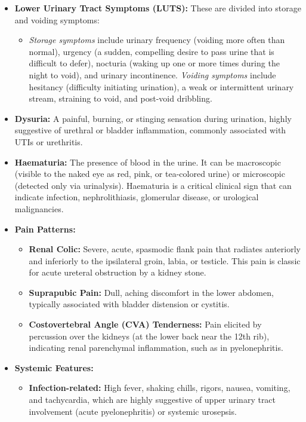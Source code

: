 \begin{itemize}
    \item \textbf{Lower Urinary Tract Symptoms (LUTS):} These are divided into storage and voiding symptoms:
    \begin{itemize}
        \item \textit{Storage symptoms} include urinary frequency (voiding more often than normal), urgency (a sudden, compelling desire to pass urine that is difficult to defer), nocturia (waking up one or more times during the night to void), and urinary incontinence.
        \textit{Voiding symptoms} include hesitancy (difficulty initiating urination), a weak or intermittent urinary stream, straining to void, and post-void dribbling.
    \end{itemize}
    \item \textbf{Dysuria:} A painful, burning, or stinging sensation during urination, highly suggestive of urethral or bladder inflammation, commonly associated with UTIs or urethritis.
    \item \textbf{Haematuria:} The presence of blood in the urine. It can be macroscopic (visible to the naked eye as red, pink, or tea-colored urine) or microscopic (detected only via urinalysis). Haematuria is a critical clinical sign that can indicate infection, nephrolithiasis, glomerular disease, or urological malignancies.
    \item \textbf{Pain Patterns:}
    \begin{itemize}
        \item \textbf{Renal Colic:} Severe, acute, spasmodic flank pain that radiates anteriorly and inferiorly to the ipsilateral groin, labia, or testicle. This pain is classic for acute ureteral obstruction by a kidney stone.
        \item \textbf{Suprapubic Pain:} Dull, aching discomfort in the lower abdomen, typically associated with bladder distension or cystitis.
        \item \textbf{Costovertebral Angle (CVA) Tenderness:} Pain elicited by percussion over the kidneys (at the lower back near the 12th rib), indicating renal parenchymal inflammation, such as in pyelonephritis.
    \end{itemize}
    \item \textbf{Systemic Features:}
    \begin{itemize}
        \item \textbf{Infection-related:} High fever, shaking chills, rigors, nausea, vomiting, and tachycardia, which are highly suggestive of upper urinary tract involvement (acute pyelonephritis) or systemic urosepsis.

\end{itemize}
\end{itemize}

